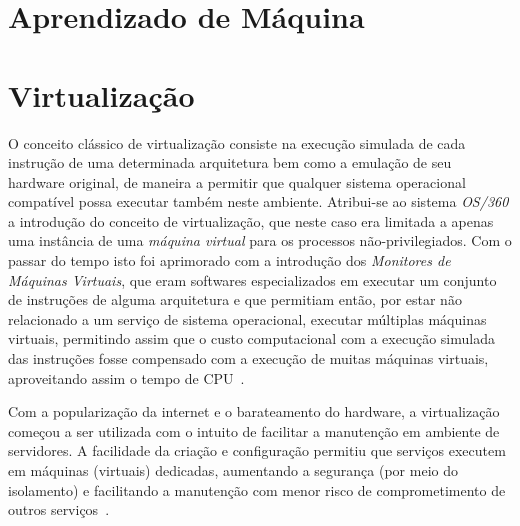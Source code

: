 %
%

\chapter{Aprendizado de Máquina}\label{sec:aprendizado}



\chapter{Virtualização}\label{sec:virt}

O conceito clássico de virtualização consiste na execução simulada de cada
instrução de uma determinada arquitetura bem como a emulação de seu hardware
original, de maneira a permitir que qualquer sistema operacional compatível
possa executar também neste ambiente.  Atribui-se ao sistema \emph{OS/360} a
introdução do conceito de virtualização, que neste caso era limitada a apenas
uma instância de uma \emph{máquina virtual} para os processos
não-privilegiados. Com o passar do tempo isto foi aprimorado com a introdução
dos \emph{Monitores de Máquinas Virtuais}, que eram softwares especializados em
executar um conjunto de instruções de alguma arquitetura e que permitiam então,
por estar não relacionado a um serviço de sistema operacional, executar
múltiplas máquinas virtuais, permitindo assim que o custo computacional com a
execução simulada das instruções fosse compensado com a execução de muitas
máquinas virtuais, aproveitando assim o tempo de CPU~\cite{goldberg1974survey}.

Com a popularização da internet e o barateamento do hardware, a
virtualização começou a ser utilizada com o intuito de facilitar a
manutenção em ambiente de servidores. A facilidade da criação e
configuração permitiu que serviços executem em máquinas (virtuais)
dedicadas, aumentando a segurança (por meio do isolamento) e facilitando a
manutenção com menor risco de comprometimento de outros
serviços~\cite{peter2005resource}.



\section{\libvirt}\label{sec:libvirt}

